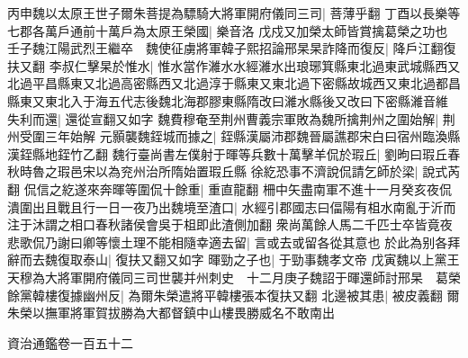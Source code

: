 丙申魏以太原王世子爾朱菩提為驃騎大將軍開府儀同三司|{
	菩薄乎翻}
丁酉以長樂等七郡各萬戶通前十萬戶為太原王榮國|{
	樂音洛}
戊戍又加榮太師皆賞擒葛榮之功也　壬子魏江陽武烈王繼卒　魏使征虜將軍韓子熙招論邢杲杲詐降而復反|{
	降戶江翻復扶又翻}
李叔仁擊杲於惟水|{
	惟水當作濰水水經濰水出琅琊箕縣東北過東武城縣西又北過平昌縣東又北過高密縣西又北過淳于縣東又東北過下密縣故城西又東北過都昌縣東又東北入于海五代志後魏北海郡膠東縣隋改曰濰水縣後又改曰下密縣濰音維}
失利而還|{
	還從宣翻又如字}
魏費穆奄至荆州曹義宗軍敗為魏所擒荆州之圍始解|{
	荆州受圍三年始解}
元顥襲魏銍城而據之|{
	銍縣漢屬沛郡魏晉屬譙郡宋白曰宿州臨渙縣漢銍縣地銍竹乙翻}
魏行臺尚書左僕射于暉等兵數十萬擊羊侃於瑕丘|{
	劉昫曰瑕丘春秋時魯之瑕邑宋以為兖州治所隋始置瑕丘縣}
徐紇恐事不濟說侃請乞師於梁|{
	說式芮翻}
侃信之紇遂來奔暉等圍侃十餘重|{
	重直龍翻}
柵中矢盡南軍不進十一月癸亥夜侃潰圍出且戰且行一日一夜乃出魏境至渣口|{
	水經引郡國志曰偪陽有柤水南亂于沂而注于沐謂之相口春秋諸侯會吳于柤即此渣側加翻}
衆尚萬餘人馬二千匹士卒皆竟夜悲歌侃乃謝曰卿等懷土理不能相隨幸適去留|{
	言或去或留各從其意也}
於此為别各拜辭而去魏復取泰山|{
	復扶又翻又如字}
暉勁之子也|{
	于勁事魏孝文帝}
戊寅魏以上黨王天穆為大將軍開府儀同三司世襲并州刺史　十二月庚子魏詔于暉還師討邢杲　葛榮餘黨韓樓復據幽州反|{
	為爾朱榮遣將平韓樓張本復扶又翻}
北邊被其患|{
	被皮義翻}
爾朱榮以撫軍將軍賀拔勝為大都督鎮中山樓畏勝威名不敢南出

資治通鑑卷一百五十二
